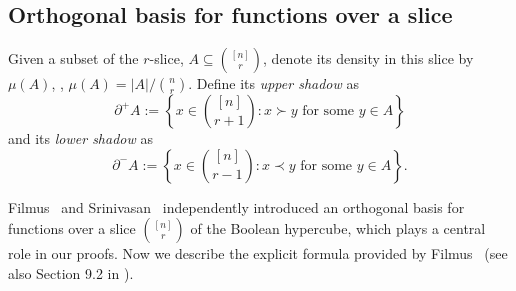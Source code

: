 \documentclass{toc}
\begin{document}
\subsection{Orthogonal basis for functions over a slice}
%
%
%
%
Given a subset of the $r$-slice, $A\subseteq \binom{[n]}{r}$, %
denote its density in this slice by $\mu(A)$, \ie, 
%
$\mu(A)=|A|/\binom{n}{r}$. %
%
%
Define its \emph{upper shadow}  %
as
%
\begin{equation} %
%
\partial^+ A:=\left\{x\in
%
\binom{[n]}{r+1} %
:x\succ y \text{ for some }y\in A\right\} %
%
\end{equation} %
%
and its \emph{lower shadow} as  %
%
\begin{equation} %
%
\partial^- A:=\left\{x\in
%
\binom{[n]}{r-1} %
:x\prec y \text{ for some } y\in A\right\}. %
%
\end{equation} %

Filmus~\cite{Filmus} and Srinivasan~\cite{srinivasan2011symmetric} independently 
introduced an orthogonal basis for functions over a
%
slice 
%
$\binom{[n]}{r}$ %
of the Boolean hypercube,   %
which plays a central role in our proofs. 
%
Now we describe the explicit formula provided by Filmus~\cite{Filmus} (see also Section 9.2 in \cite{FilmusM16}). %
%
%
%
%

%
%
%
%
%
%
%
%
%
%
%
\end{document}
